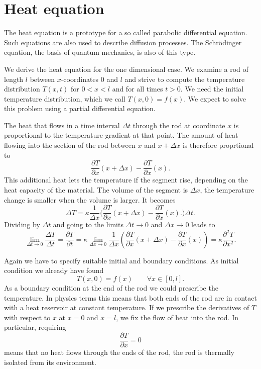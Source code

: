 %
%
%
\section{Heat equation}
The heat equation is a prototype for a so called parabolic differential
equation.
Such equations are also used to describe diffusion processes.
The Schrödinger equation, the basis of quantum mechanics, is also of this type.

We derive the heat equation for the one dimensional case.
We examine a rod of length $l$ between $x$-coordinates $0$ and $l$
and strive to compute the temperature distribution $T(x,t)$ for 
$0<x<l$ and for all times $t>0$.
We need the initial temperature distribution, which we call
$T(x,0) = f(x)$.
We expect to solve this problem using a partial differential equation.

The heat that flows in a time interval $\Delta t$ through the rod at
coordinate $x$ is proportional to the temperature gradient at that point.
The amount of heat flowing into the section  of the rod between
$x$ and $x+\Delta x$ is therefore proprtional to
\[
\frac{\partial T}{\partial x}(x+\Delta x)-\frac{\partial T}{\partial x}(x).
\]
This additional heat lets the temperature if the segment rise, depending
on the heat capacity of the material.
The volume of the segment is $\Delta x$, the temperature change is smaller
when the volume is larger.
It becomes
\[
\Delta T
=
\kappa
\frac{1}{\Delta x}
\biggl(
\frac{\partial T}{\partial x}(x+\Delta x)-\frac{\partial T}{\partial x}(x).
\biggr) \Delta t.
\]
Dividing by $\Delta t$ and going to the limits $\Delta t\to 0$
and $\Delta x\to 0$ leads to
\[
\lim_{\Delta t\to 0}\frac{\Delta T}{\Delta t}
=
\frac{\partial T}{\partial t}
=
\kappa
\lim_{\Delta x\to 0}\frac1{\Delta x}\left(\frac{\partial T}{\partial x}(x+\Delta x)-\frac{\partial T}{\partial x}(x)\right)
=\kappa\frac{\partial^2T}{\partial x^2}.
\]

Again we have to specify suitable initial and boundary conditions.
As initial condition we already have found
\[
T(x,0)=f(x)\qquad \forall x\in[0,l].
\]
As a boundary condition at the end of the rod we could prescribe the
temperature.
In physics terms this means that both ends of the rod are in contact
with a heat reservoir at constant temperature.
If we prescribe the derivatives of $T$ with respect to $x$ at $x=0$ and
$x=l$, we fix the flow of heat into the rod.
In particular, requiring
\[
\frac{\partial T}{\partial x} = 0
\]
means that no heat flows through the ends of the rod, the rod is
thermally isolated from its environment.

